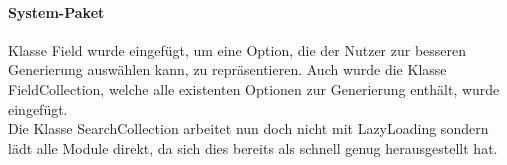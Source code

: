 \paragraph{System-Paket}
Klasse Field wurde eingefügt, um eine Option, die der Nutzer zur besseren Generierung auswählen kann, zu repräsentieren. Auch wurde die Klasse FieldCollection, welche alle existenten Optionen zur Generierung enthält, wurde eingefügt.\\
Die Klasse SearchCollection arbeitet nun doch nicht mit LazyLoading sondern lädt alle Module direkt, da sich dies bereits als schnell genug herausgestellt hat.
